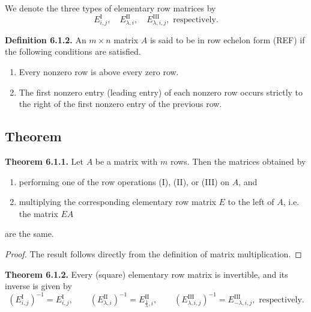 \documentclass[12pt]{article}
\begin{document}
We denote the three types of elementary row matrices by
\[
E^{\mathrm{I}}_{i,j},
\quad
E^{\mathrm{II}}_{\lambda,i},
\quad
E^{\mathrm{III}}_{\lambda,i,j},
\text{ respectively.}
\]

\textbf{Definition 6.1.2.}
An $m\times n$ matrix $A$ is said to be in row echelon form (REF)
if the following conditions are satisfied.

\begin{enumerate}
    \item Every nonzero row is above every zero row.
    \item The first nonzero entry (leading entry) of each nonzero row
    occurs strictly to the right of the first nonzero entry of the
    previous row.
\end{enumerate}

\subsection{Theorem}

\textbf{Theorem 6.1.1.}
Let $A$ be a matrix with $m$ rows. Then the matrices obtained by
\begin{enumerate}
    \item performing one of the row operations (I), (II), or (III) on $A$, and
    \item multiplying the corresponding elementary row matrix $E$ to the left of $A$, i.e. the matrix
    $EA$
\end{enumerate}
are the same.

\begin{proof}
The result follows directly from the definition of matrix multiplication.
\end{proof}

\textbf{Theorem 6.1.2.}
Every (square) elementary row matrix is invertible, and its inverse is given by
\[
\left(E^{\mathrm{I}}_{i,j}\right)^{-1}=E^{\mathrm{I}}_{i,j},\qquad
\left(E^{\mathrm{II}}_{\lambda,i}\right)^{-1}=E^{\mathrm{II}}_{\frac{1}{\lambda},i},\qquad
\left(E^{\mathrm{III}}_{\lambda,i,j}\right)^{-1}=E^{\mathrm{III}}_{-\lambda,i,j},
\text{ respectively.}
\]
\end{document}
